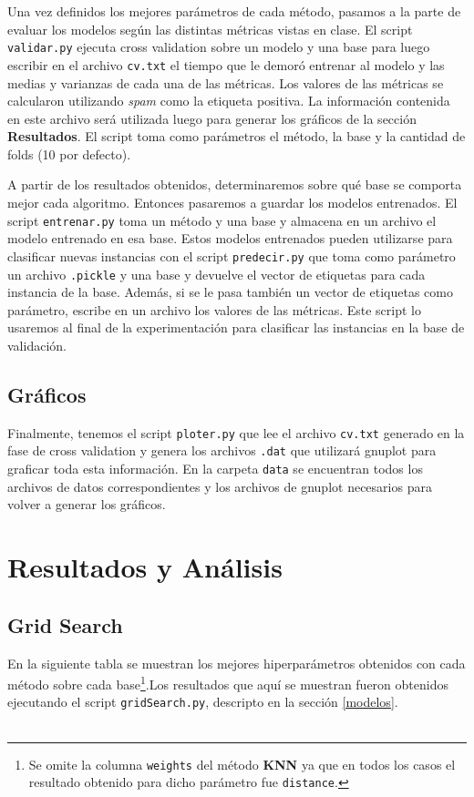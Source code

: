 \documentclass[10pt, a4paper]{article}
\begin{document}
Una vez definidos los mejores parámetros de cada método, pasamos a la parte de evaluar los modelos según las distintas métricas vistas en clase. El script \texttt{validar.py} ejecuta cross validation sobre un modelo y una base para luego escribir en el archivo \texttt{cv.txt} el tiempo que le demoró entrenar al modelo y las medias y varianzas de cada una de las métricas. Los valores de las métricas se calcularon utilizando \textit{spam} como la etiqueta positiva. La información contenida en este archivo será utilizada luego para generar los gráficos de la sección \textbf{Resultados}. El script toma como parámetros el método, la base y la cantidad de folds (10 por defecto).

A partir de los resultados obtenidos, determinaremos sobre qué base se comporta mejor cada algoritmo. Entonces pasaremos a guardar los modelos entrenados. El script \texttt{entrenar.py} toma un método y una base y almacena en un archivo el modelo entrenado en esa base. Estos modelos entrenados pueden utilizarse para clasificar nuevas instancias con el script \texttt{predecir.py} que toma como parámetro un archivo \texttt{.pickle} y una base y devuelve el vector de etiquetas para cada instancia de la base. Además, si se le pasa también un vector de etiquetas como parámetro, escribe en un archivo los valores de las métricas. Este script lo usaremos al final de la experimentación para clasificar las instancias en la base de validación.

\subsection{Gráficos}

Finalmente, tenemos el script \texttt{ploter.py} que lee el archivo \texttt{cv.txt} generado en la fase de cross validation y genera los archivos \texttt{.dat} que utilizará gnuplot para graficar toda esta información. En la carpeta \texttt{data} se encuentran todos los archivos de datos correspondientes y los archivos de gnuplot necesarios para volver a generar los gráficos.

\section{Resultados y Análisis}

\subsection{Grid Search}
En la siguiente tabla se muestran los mejores hiperparámetros obtenidos con cada método sobre cada base\footnote{Se omite la columna \texttt{weights} del método \textbf{KNN} ya que en todos los casos el resultado obtenido para dicho parámetro fue \texttt{distance}.}.Los resultados que aquí se muestran fueron obtenidos ejecutando el script \texttt{gridSearch.py}, descripto en la sección \ref{modelos}.
\\\\
\end{document}
